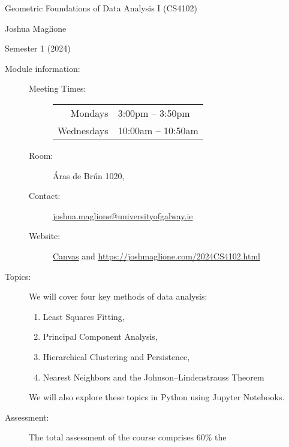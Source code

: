 \documentclass[a4paper, 12pt]{article}
\begin{document}
\pagestyle{empty}

\begin{center}
{\Large Geometric Foundations of Data Analysis I (CS4102)} 

\vspace{0.25cm}

{\large Joshua Maglione}

\vspace{0.25cm}

Semester 1 (2024)
\end{center}

\vspace{0.5cm}

\begin{description}
    \item[Module information:] \hfill
    \begin{description}
      \item[Meeting Times:] \hfill
      \begin{center}
        \begin{tabular}{rl}
          Mondays & 3:00pm -- 3:50pm \\ 
          Wednesdays & 10:00am -- 10:50am
        \end{tabular}
      \end{center}
      \item[Room:] \'Aras de Br\'un 1020,
      \item[Contact:] \url{joshua.maglione@universityofgalway.ie} 
      \item[Website:] \href{https://universityofgalway.instructure.com/}{\textsf{Canvas}} and \url{https://joshmaglione.com/2024CS4102.html} 
    \end{description} 
    \vspace{1cm}
    \item[Topics:] We will cover four key methods of data analysis:
    \begin{enumerate} 
      \item Least Squares Fitting,
      \item Principal Component Analysis,
      \item Hierarchical Clustering and Persistence,
      \item Nearest Neighbors and the Johnson--Lindenstrauss Theorem
    \end{enumerate}
    We will also explore these topics in Python using Jupyter Notebooks.
    \vspace{1cm}
    \item[Assessment:] The total assessment of the course comprises 60\% the

\end{description}
\end{document}
